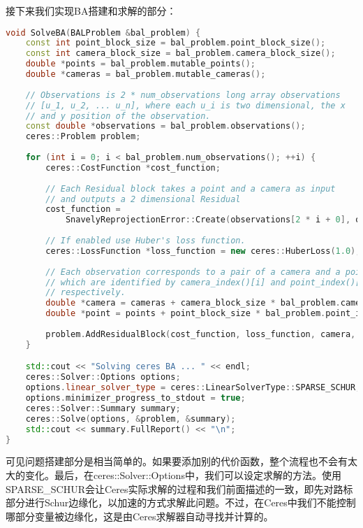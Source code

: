 接下来我们实现BA搭建和求解的部分：
\begin{lstlisting}[language=c++, caption=slambook2/ch9/SnavelyReprojectionError.cpp（片段）]
void SolveBA(BALProblem &bal_problem) {
	const int point_block_size = bal_problem.point_block_size();
	const int camera_block_size = bal_problem.camera_block_size();
	double *points = bal_problem.mutable_points();
	double *cameras = bal_problem.mutable_cameras();
	
	// Observations is 2 * num_observations long array observations
	// [u_1, u_2, ... u_n], where each u_i is two dimensional, the x
	// and y position of the observation.
	const double *observations = bal_problem.observations();
	ceres::Problem problem;
	
	for (int i = 0; i < bal_problem.num_observations(); ++i) {
		ceres::CostFunction *cost_function;
		
		// Each Residual block takes a point and a camera as input
		// and outputs a 2 dimensional Residual
		cost_function = 
			SnavelyReprojectionError::Create(observations[2 * i + 0], observations[2 * i + 1]);
		
		// If enabled use Huber's loss function.
		ceres::LossFunction *loss_function = new ceres::HuberLoss(1.0);
		
		// Each observation corresponds to a pair of a camera and a point
		// which are identified by camera_index()[i] and point_index()[i]
		// respectively.
		double *camera = cameras + camera_block_size * bal_problem.camera_index()[i];
		double *point = points + point_block_size * bal_problem.point_index()[i];
		
		problem.AddResidualBlock(cost_function, loss_function, camera, point);
	}

	std::cout << "Solving ceres BA ... " << endl;
	ceres::Solver::Options options;
	options.linear_solver_type = ceres::LinearSolverType::SPARSE_SCHUR;
	options.minimizer_progress_to_stdout = true;
	ceres::Solver::Summary summary;
	ceres::Solve(options, &problem, &summary);
	std::cout << summary.FullReport() << "\n";
}
\end{lstlisting}
可见问题搭建部分是相当简单的。如果要添加别的代价函数，整个流程也不会有太大的变化。最后，在ceres::Solver::Options中，我们可以设定求解的方法。使用SPARSE\_SCHUR会让Ceres实际求解的过程和我们前面描述的一致，即先对路标部分进行Schur边缘化，以加速的方式求解此问题。不过，在Ceres中我们不能控制哪部分变量被边缘化，这是由Ceres求解器自动寻找并计算的。

